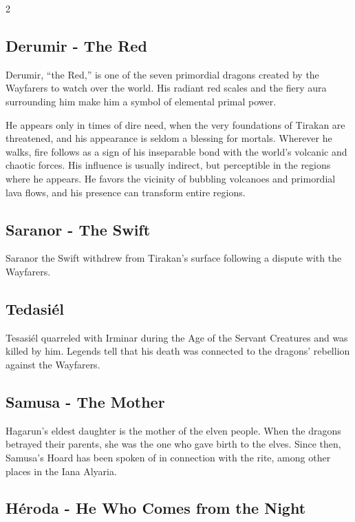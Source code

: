 \begin{multicols}{2}
{\subsection{Derumir - The Red}\label{subsec:derumir---der-rote}

Derumir, ``the Red,'' is one of the seven primordial dragons created by the Wayfarers to watch over the world. His radiant red scales and the fiery aura surrounding him make him a symbol of elemental primal power.

He appears only in times of dire need, when the very foundations of Tirakan are threatened, and his appearance is seldom a blessing for mortals. Wherever he walks, fire follows as a sign of his inseparable bond with the world's volcanic and chaotic forces. His influence is usually indirect, but perceptible in the regions where he appears. He favors the vicinity of bubbling volcanoes and primordial lava flows, and his presence can transform entire regions.

\subsection{Saranor - The Swift}\label{subsec:saranor-der-schnelle}

Saranor the Swift withdrew from Tirakan's surface following a dispute with the Wayfarers.

\subsection{Tedasiél}\label{subsec:tedasiel}

Tesasiél quarreled with Irminar during the Age of the Servant Creatures and was killed by him. Legends tell that his death was connected to the dragons' rebellion against the Wayfarers.

\subsection{Samusa - The Mother}\label{subsec:samusa-die-mutter}

Hagarun's eldest daughter is the mother of the elven people. When the dragons betrayed their parents, she was the one who gave birth to the elves. Since then, Samusa's Hoard has been spoken of in connection with the rite, among other places in the Iana Alyaria.

\subsection{Héroda - He Who Comes from the Night}\label{subsec:heroda-der-aus-der-nacht-kommt}

}
\end{multicols}
